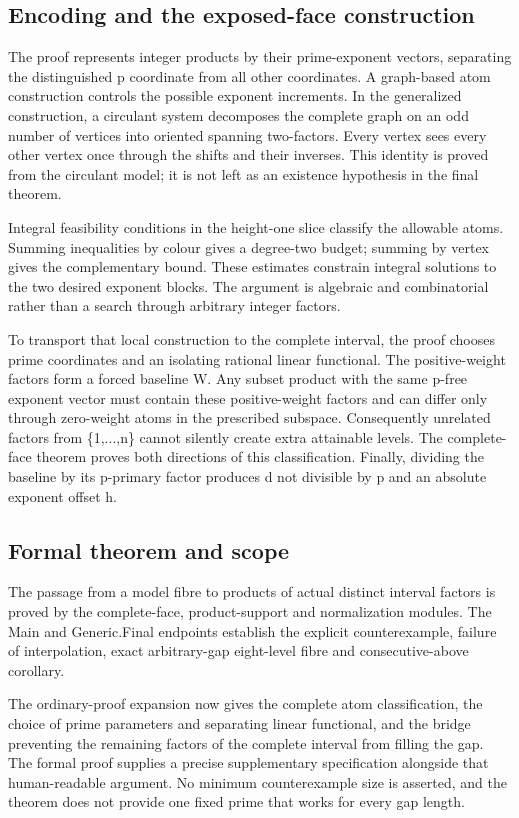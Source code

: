 \documentclass[11pt,a4paper]{article}
\begin{document}
\subsection{Encoding and the exposed-face construction}
The proof represents integer products by their prime-exponent vectors, separating the distinguished p coordinate from all other coordinates. A graph-based atom construction controls the possible exponent increments. In the generalized construction, a circulant system decomposes the complete graph on an odd number of vertices into oriented spanning two-factors. Every vertex sees every other vertex once through the shifts and their inverses. This identity is proved from the circulant model; it is not left as an existence hypothesis in the final theorem.

Integral feasibility conditions in the height-one slice classify the allowable atoms. Summing inequalities by colour gives a degree-two budget; summing by vertex gives the complementary bound. These estimates constrain integral solutions to the two desired exponent blocks. The argument is algebraic and combinatorial rather than a search through arbitrary integer factors.

To transport that local construction to the complete interval, the proof chooses prime coordinates and an isolating rational linear functional. The positive-weight factors form a forced baseline W. Any subset product with the same p-free exponent vector must contain these positive-weight factors and can differ only through zero-weight atoms in the prescribed subspace. Consequently unrelated factors from \{1,...,n\} cannot silently create extra attainable levels. The complete-face theorem proves both directions of this classification. Finally, dividing the baseline by its p-primary factor produces d not divisible by p and an absolute exponent offset h.

\subsection{Formal theorem and scope}
The passage from a model fibre to products of actual distinct interval factors is proved by the complete-face, product-support and normalization modules. The Main and Generic.Final endpoints establish the explicit counterexample, failure of interpolation, exact arbitrary-gap eight-level fibre and consecutive-above corollary.

The ordinary-proof expansion now gives the complete atom classification, the choice of prime parameters and separating linear functional, and the bridge preventing the remaining factors of the complete interval from filling the gap. The formal proof supplies a precise supplementary specification alongside that human-readable argument. No minimum counterexample size is asserted, and the theorem does not provide one fixed prime that works for every gap length.
\end{document}
